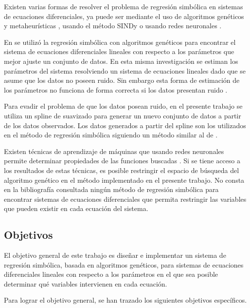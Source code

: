 Existen varias formas de resolver el problema de regresión simbólica en sistemas de ecuaciones diferenciales, ya puede ser mediante el uso de algoritmos genéticos y metaheurísticas \cite{koza1994genetic, schmidt2013eureqa}, usando el método SINDy \cite{brunton2016discovering} o usando redes neuronales \cite{udrescu2020ai}.

En \cite{iba2008inference} se utilizó la regresión simbólica con algoritmos genéticos para encontrar el sistema de ecuaciones diferenciales lineales con respecto a los parámetros que mejor ajuste un conjunto de datos. En esta misma investigación se estiman los parámetros del sistema resolviendo un sistema de ecuaciones lineales dado que se asume que los datos no poseen ruido. Sin embargo esta forma de estimación de los parámetros no funciona de forma correcta si los datos presentan ruido \cite{essays2019ordinary}.

Para evadir el problema de que los datos posean ruido, en el presente trabajo se utiliza un spline de suavizado \cite{green1993nonparametric} para generar un nuevo conjunto de datos a partir de los datos observados. Los datos generados a partir del spline son los utilizados en el método de regresión simbólica siguiendo un método similar al de \cite{iba2008inference}.

Existen técnicas de aprendizaje de máquinas que usando redes neuronales permite determinar propiedades de las funciones buscadas \cite{udrescu2020ai}. Si se tiene acceso a los resultados de estas técnicas, es posible restringir el espacio de búsqueda del algoritmo genético en el método implementado en el presente trabajo. No consta en la bibliografía consultada ningún método de regresión simbólica para encontrar sistemas de ecuaciones diferenciales que permita restringir las variables que pueden existir en cada ecuación del sistema.


\subsection*{Objetivos}

El objetivo general de este trabajo es diseñar e implementar un sistema de regresión simbólica, basada en algoritmos genéticos, para sistemas de ecuaciones diferenciales lineales con respecto a los parámetros en el que sea posible determinar qué variables intervienen en cada ecuación.

Para lograr el objetivo general, se han trazado los siguientes objetivos específicos.

